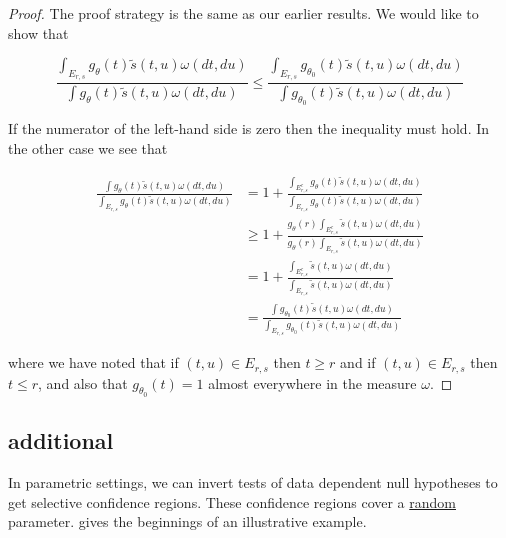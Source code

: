 \documentclass{article}
\begin{document}
\begin{appendix}
\begin{proof}
    The proof strategy is the same as our earlier results. We would like to show that 

    \begin{equation*}
        \frac{\int_{E_{r, s}} g_{\theta}(t) \tilde{s}(t, u) \omega(dt, du) }{\int g_{\theta}(t) \tilde{s}(t, u) \omega(dt, du) } \leq  \frac{\int_{E_{r, s}} g_{\theta_0}(t) \tilde{s}(t, u) \omega(dt, du) }{\int g_{\theta_0}(t) \tilde{s}(t, u) \omega(dt, du) } 
    \end{equation*}

    If the numerator of the left-hand side is zero then the inequality must hold. In the other case we see that 

    \begin{align*}
        \frac{\int g_{\theta}(t) \tilde{s}(t, u) \omega(dt, du)}{\int_{E_{r, s}} g_{\theta}(t) \tilde{s}(t, u) \omega(dt, du) } &= 1 + \frac{\int_{E_{r, s}^c} g_{\theta}(t) \tilde{s}(t, u) \omega(dt, du)}{\int_{E_{r, s}} g_{\theta}(t) \tilde{s}(t, u) \omega(dt, du) } \\
        &\geq 1 + \frac{ g_{\theta}(r) \int_{E_{r, s}^c} \tilde{s}(t, u) \omega(dt, du)}{g_{\theta}(r)\int_{E_{r, s}}  \tilde{s}(t, u) \omega(dt, du) } \\
        &= 1 + \frac{  \int_{E_{r, s}^c} \tilde{s}(t, u) \omega(dt, du)}{\int_{E_{r, s}}  \tilde{s}(t, u) \omega(dt, du) }\\
        &= \frac{\int g_{\theta_0}(t) \tilde{s}(t, u) \omega(dt, du)}{\int_{E_{r, s}} g_{\theta_0}(t) \tilde{s}(t, u) \omega(dt, du) }
    \end{align*}

    where we have noted that if $(t, u) \in E_{r, s}$ then $t \geq r$ and if $(t, u) \in E_{r, s}$ then $t \leq r$, and also that $g_{\theta_0}(t) = 1$ almost everywhere in the measure $\omega$.  
\end{proof}

\subsection{additional}
\label{sec:sel_conf_region_appdx}

In parametric settings, we can  invert tests of data dependent null hypotheses to get selective confidence regions. These confidence regions cover a \underline{random} parameter.  gives the beginnings of an illustrative example. 


\end{appendix}
\end{document}
